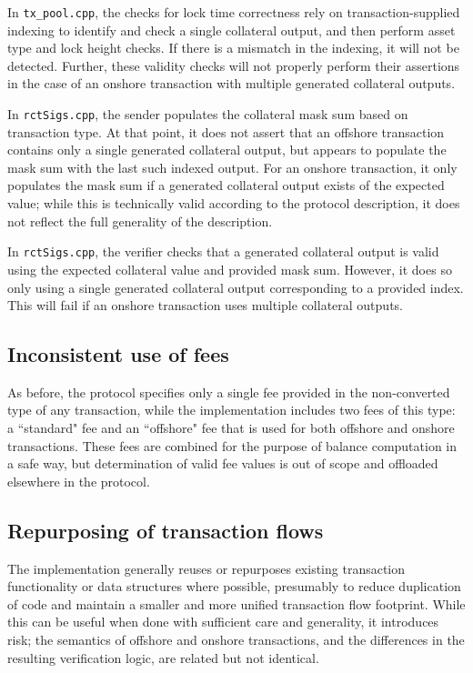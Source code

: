 \documentclass{article}
\begin{document}
In \texttt{tx\_pool.cpp}, the checks for lock time correctness rely on transaction-supplied indexing to identify and check a single collateral output, and then perform asset type and lock height checks.
If there is a mismatch in the indexing, it will not be detected.
Further, these validity checks will not properly perform their assertions in the case of an onshore transaction with multiple generated collateral outputs.

In \texttt{rctSigs.cpp}, the sender populates the collateral mask sum based on transaction type.
At that point, it does not assert that an offshore transaction contains only a single generated collateral output, but appears to populate the mask sum with the last such indexed output.
For an onshore transaction, it only populates the mask sum if a generated collateral output exists of the expected value; while this is technically valid according to the protocol description, it does not reflect the full generality of the description.

In \texttt{rctSigs.cpp}, the verifier checks that a generated collateral output is valid using the expected collateral value and provided mask sum.
However, it does so only using a single generated collateral output corresponding to a provided index.
This will fail if an onshore transaction uses multiple collateral outputs.


\subsection{Inconsistent use of fees}

As before, the protocol specifies only a single fee provided in the non-converted type of any transaction, while the implementation includes two fees of this type: a ``standard" fee and an ``offshore" fee that is used for both offshore and onshore transactions.
These fees are combined for the purpose of balance computation in a safe way, but determination of valid fee values is out of scope and offloaded elsewhere in the protocol.


\subsection{Repurposing of transaction flows}

The implementation generally reuses or repurposes existing transaction functionality or data structures where possible, presumably to reduce duplication of code and maintain a smaller and more unified transaction flow footprint.
While this can be useful when done with sufficient care and generality, it introduces risk; the semantics of offshore and onshore transactions, and the differences in the resulting verification logic, are related but not identical.
\end{document}
